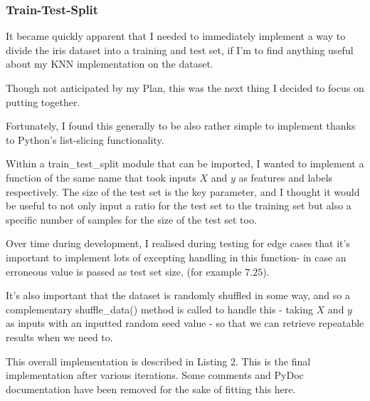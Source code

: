 \documentclass[letterpaper,10pt]{article}
\begin{document}
\subsubsection{Train-Test-Split}
It became quickly apparent that I needed to immediately implement a way to divide the iris dataset into a training and test set, if I'm to find anything useful about my KNN implementation on the dataset. \par
Though not anticipated by my Plan, this was the next thing I decided to focus on putting together. \par

Fortunately, I found this generally to be also rather simple to implement thanks to Python's list-slicing functionality. \par
Within a train\_test\_split module that can be imported, I wanted to implement a function of the same name that took inputs \(X\) and \(y\) as features and labels respectively. The size of the test set is the key parameter, and I thought it would be useful to not only input a ratio for the test set to the training set but also a specific number of samples for the size of the test set too. \par
Over time during development, I realised during testing for edge cases that it's important to implement lots of excepting handling in this function- in case an erroneous value is passed as test set size, (for example \(7.25\)). \par
It's also important that the dataset is randomly shuffled in some way, and so a complementary shuffle\_data() method is called to handle this - taking \(X\) and \(y\) as inputs with an inputted random seed value - so that we can retrieve repeatable results when we need to. \par
This overall implementation is described in Listing 2. This is the final implementation after various iterations. Some comments and PyDoc documentation have been removed for the sake of fitting this here. \par
\end{document}
